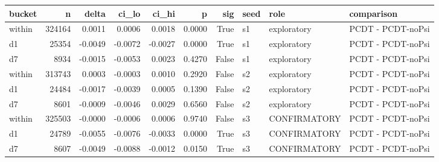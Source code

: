 \begin{tabular}{lrrrrrrlll}
\toprule
bucket & n & delta & ci\_lo & ci\_hi & p & sig & seed & role & comparison \\
\midrule
within & 324164 & 0.0011 & 0.0006 & 0.0018 & 0.0000 & True & s1 & exploratory & PCDT - PCDT-noPsi \\
d1 & 25354 & -0.0049 & -0.0072 & -0.0027 & 0.0000 & True & s1 & exploratory & PCDT - PCDT-noPsi \\
d7 & 8934 & -0.0015 & -0.0053 & 0.0023 & 0.4270 & False & s1 & exploratory & PCDT - PCDT-noPsi \\
within & 313743 & 0.0003 & -0.0003 & 0.0010 & 0.2920 & False & s2 & exploratory & PCDT - PCDT-noPsi \\
d1 & 24484 & -0.0017 & -0.0039 & 0.0005 & 0.1390 & False & s2 & exploratory & PCDT - PCDT-noPsi \\
d7 & 8601 & -0.0009 & -0.0046 & 0.0029 & 0.6560 & False & s2 & exploratory & PCDT - PCDT-noPsi \\
within & 325503 & -0.0000 & -0.0006 & 0.0006 & 0.9740 & False & s3 & CONFIRMATORY & PCDT - PCDT-noPsi \\
d1 & 24789 & -0.0055 & -0.0076 & -0.0033 & 0.0000 & True & s3 & CONFIRMATORY & PCDT - PCDT-noPsi \\
d7 & 8607 & -0.0049 & -0.0088 & -0.0012 & 0.0150 & True & s3 & CONFIRMATORY & PCDT - PCDT-noPsi \\
\bottomrule
\end{tabular}
